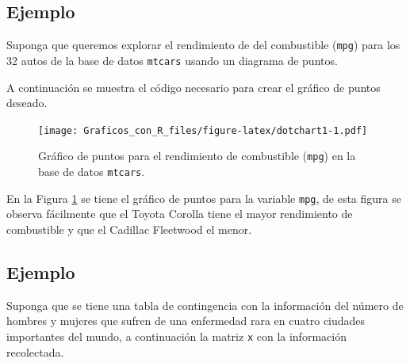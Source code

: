 \documentclass[10pt,]{krantz}
\makeatletter
\newenvironment{Shaded}{\begin{snugshade}}{\end{snugshade}}
\newcommand{\KeywordTok}[1]{\textcolor[rgb]{0.13,0.29,0.53}{\textbf{#1}}}
\newcommand{\DataTypeTok}[1]{\textcolor[rgb]{0.13,0.29,0.53}{#1}}
\newcommand{\FloatTok}[1]{\textcolor[rgb]{0.00,0.00,0.81}{#1}}
\newcommand{\StringTok}[1]{\textcolor[rgb]{0.31,0.60,0.02}{#1}}
\newcommand{\CommentTok}[1]{\textcolor[rgb]{0.56,0.35,0.01}{\textit{#1}}}
\newcommand{\OperatorTok}[1]{\textcolor[rgb]{0.81,0.36,0.00}{\textbf{#1}}}
\newcommand{\NormalTok}[1]{#1}
\newenvironment{kframe}{%
\medskip{}
\setlength{\fboxsep}{.8em}
 \def\at@end@of@kframe{}%
 \ifinner\ifhmode%
  \def\at@end@of@kframe{\end{minipage}}%
  \begin{minipage}{\columnwidth}%
 \fi\fi%
 \def\FrameCommand##1{\hskip\@totalleftmargin \hskip-\fboxsep
 \colorbox{shadecolor}{##1}\hskip-\fboxsep
     \hskip-\linewidth \hskip-\@totalleftmargin \hskip\columnwidth}%
 \MakeFramed {\advance\hsize-\width
   \@totalleftmargin\z@ \linewidth\hsize
   \@setminipage}}%
 {\par\unskip\endMakeFramed%
 \at@end@of@kframe}
\renewenvironment{Shaded}{\begin{kframe}}{\end{kframe}}
\makeatother
\begin{document}
\subsection*{Ejemplo}\label{ejemplo-31}


Suponga que queremos explorar el rendimiento de del combustible
(\texttt{mpg}) para los 32 autos de la base de datos \texttt{mtcars}
usando un diagrama de puntos.

A continuación se muestra el código necesario para crear el gráfico de
puntos deseado.

\begin{Shaded}
\end{Shaded}

\begin{figure}
\centering
\texttt{[image: Graficos\_con\_R\_files/figure-latex/dotchart1-1.pdf]}
\caption{\label{fig:dotchart1}Gráfico de puntos para el rendimiento de
combustible (\texttt{mpg}) en la base de datos \texttt{mtcars}.}
\end{figure}

En la Figura \ref{fig:dotchart1} se tiene el gráfico de puntos para la
variable \texttt{mpg}, de esta figura se observa fácilmente que el
Toyota Corolla tiene el mayor rendimiento de combustible y que el
Cadillac Fleetwood el menor.

\subsection*{Ejemplo}\label{ejemplo-32}


Suponga que se tiene una tabla de contingencia con la información del
número de hombres y mujeres que sufren de una enfermedad rara en cuatro
ciudades importantes del mundo, a continuación la matriz \texttt{x} con
la información recolectada.
\end{document}
